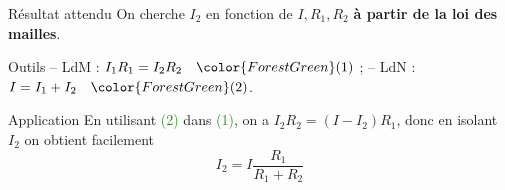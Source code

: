 \documentclass[../main/main.tex]{subfiles}
\begin{document}
\begin{tcbraster}[raster columns=3, raster equal height=rows]
    \begin{NCprop}{Résultat attendu}
        On cherche $I_2$ en fonction de $I, R_1, R_2$ \textbf{à partir de la loi
        des mailles}.
    \end{NCprop}
    \begin{NCdemo}{Outils}
        -- LdM : $I_1R_1 = I_2R_2 \quad \color{ForestGreen}(1)$ ;
        \smallbreak
        -- LdN : $I = I_1 + I_2 \quad \color{ForestGreen}(2)$.
    \end{NCdemo}
    \begin{NCexem}{Application}
        En utilisant \textcolor{ForestGreen}{(2)} dans
        \textcolor{ForestGreen}{(1)}, on a $I_2R_2 = (I-I_2)R_1$, donc en
        isolant $I_2$ on obtient facilement \[\boxed{I_2 = I
        \frac{R_1}{R_1+R_2}}\]
    \end{NCexem}
\end{tcbraster}
\end{document}
